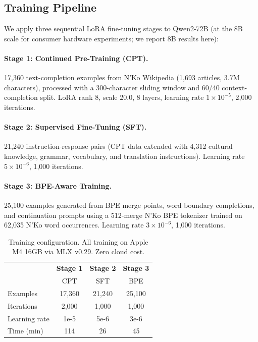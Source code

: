 \documentclass[11pt]{article}
\begin{document}
\subsection{Training Pipeline}

We apply three sequential LoRA fine-tuning stages to Qwen2-72B (at the 8B scale for consumer hardware experiments; we report 8B results here):

\paragraph{Stage 1: Continued Pre-Training (CPT).}
17,360 text-completion examples from N'Ko Wikipedia (1,693 articles, 3.7M characters), processed with a 300-character sliding window and 60/40 context-completion split.
LoRA rank 8, scale 20.0, 8 layers, learning rate $1 \times 10^{-5}$, 2,000 iterations.

\paragraph{Stage 2: Supervised Fine-Tuning (SFT).}
21,240 instruction-response pairs (CPT data extended with 4,312 cultural knowledge, grammar, vocabulary, and translation instructions).
Learning rate $5 \times 10^{-6}$, 1,000 iterations.

\paragraph{Stage 3: BPE-Aware Training.}
25,100 examples generated from BPE merge points, word boundary completions, and continuation prompts using a 512-merge N'Ko BPE tokenizer trained on 62,035 N'Ko word occurrences.
Learning rate $3 \times 10^{-6}$, 1,000 iterations.

\begin{table}[t]
\centering
\small
\begin{tabular}{lccc}
\toprule
& \textbf{Stage 1} & \textbf{Stage 2} & \textbf{Stage 3} \\
& CPT & SFT & BPE \\
\midrule
Examples & 17,360 & 21,240 & 25,100 \\
Iterations & 2,000 & 1,000 & 1,000 \\
Learning rate & 1e-5 & 5e-6 & 3e-6 \\
Time (min) & 114 & 26 & 45 \\
\bottomrule
\end{tabular}
\caption{Training configuration. All training on Apple M4 16GB via MLX v0.29. Zero cloud cost.}
\label{tab:training-config}
\end{table}
\end{document}
